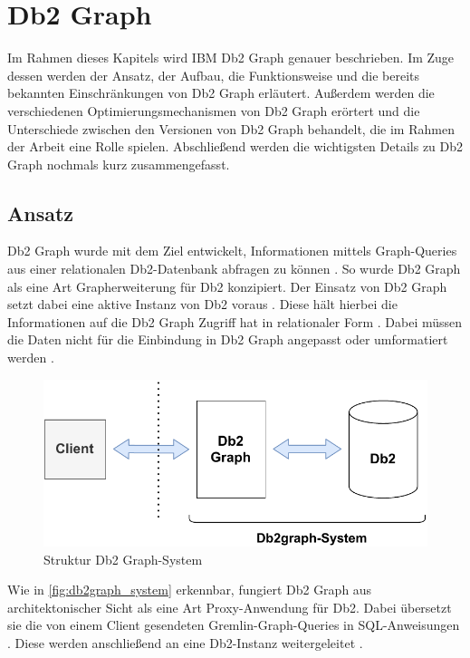 \section{Db2 Graph}
\label{chap:db2graph}

Im Rahmen dieses Kapitels wird IBM Db2 Graph genauer beschrieben. Im Zuge dessen werden der Ansatz, der Aufbau, die Funktionsweise und die bereits bekannten Einschränkungen von Db2 Graph erläutert. Außerdem werden die verschiedenen Optimierungsmechanismen von Db2 Graph erörtert und die Unterschiede zwischen den Versionen von Db2 Graph behandelt, die im Rahmen der Arbeit eine Rolle spielen. Abschließend werden die wichtigsten Details zu Db2 Graph nochmals kurz zusammengefasst.

\subsection{Ansatz}
\label{db2graph:ansatz}
Db2 Graph wurde mit dem Ziel entwickelt, Informationen mittels Graph-Queries aus einer relationalen Db2-Datenbank abfragen zu können \cite{vldb_tian, sigmod_tian}. So wurde Db2 Graph als eine Art Grapherweiterung für Db2 konzipiert. Der Einsatz von Db2 Graph setzt dabei eine aktive Instanz von Db2 voraus \cite{vldb_tian, sigmod_tian}. Diese hält hierbei die Informationen auf die Db2 Graph Zugriff hat in relationaler Form \cite{vldb_tian, sigmod_tian}. Dabei müssen die Daten nicht für die Einbindung in Db2 Graph angepasst oder umformatiert werden \cite{vldb_tian, sigmod_tian}.

\begin{figure}[ht]
    \centering
    \includegraphics[width=\textwidth]{images/db2graph_system.pdf}
    \vspace{0.1em}
    \caption{Struktur Db2 Graph-System}
    \label{fig:db2graph_system}
\end{figure}

Wie in \autoref{fig:db2graph_system} erkennbar, fungiert Db2 Graph aus architektonischer Sicht als eine Art Proxy-Anwendung für Db2. Dabei übersetzt sie die von einem Client gesendeten Gremlin-Graph-Queries in SQL-An\-wei\-sung\-en \cite{vldb_tian, sigmod_tian}. Diese werden anschließend an eine Db2-Instanz weitergeleitet \cite{vldb_tian, sigmod_tian}. 

